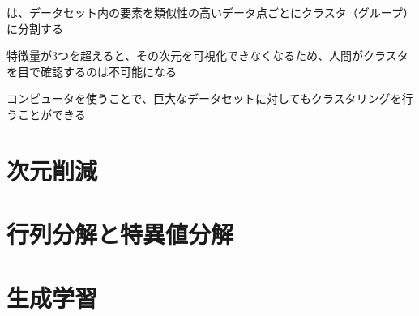 \documentclass[../../../topic_machine-learning]{subfiles}
\begin{document}
は、データセット内の要素を類似性の高いデータ点ごとにクラスタ（グループ）に分割する

\br

特徴量が3つを超えると、その次元を可視化できなくなるため、人間がクラスタを目で確認するのは不可能になる

コンピュータを使うことで、巨大なデータセットに対してもクラスタリングを行うことができる

\sectionline
\section{次元削減}

\todo{}

\sectionline
\section{行列分解と特異値分解}

\todo{}

\sectionline
\section{生成学習}

\todo{}
\end{document}
